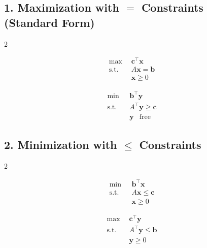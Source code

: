 \subsection*{1. Maximization with $=$ Constraints (Standard Form)}

\begin{multicols}{2}
\begin{tcolorbox}[title=Primal (P), colback=blue!5, colframe=blue!40!black]
\[
\begin{aligned}
\max\ & \mathbf{c}^\top \mathbf{x} \\
\text{s.t.} \quad & A \mathbf{x} = \mathbf{b} \\
& \mathbf{x} \geq 0
\end{aligned}
\]
\end{tcolorbox}

\columnbreak

\begin{tcolorbox}[title=Dual (D), colback=green!5, colframe=green!40!black]
\[
\begin{aligned}
\min\ & \mathbf{b}^\top \mathbf{y} \\
\text{s.t.} \quad & A^\top \mathbf{y} \geq \mathbf{c} \\
& \mathbf{y} \ \ \text{ free}
\end{aligned}
\]
\end{tcolorbox}
\end{multicols}

\subsection*{2. Minimization with $\leq$ Constraints}

\begin{multicols}{2}
\begin{tcolorbox}[title=Primal (P), colback=blue!5, colframe=blue!40!black]
\[
\begin{aligned}
\min\ & \mathbf{b}^\top \mathbf{x} \\
\text{s.t.} \quad & A \mathbf{x} \leq \mathbf{c} \\
& \mathbf{x} \geq 0
\end{aligned}
\]
\end{tcolorbox}

\columnbreak

\begin{tcolorbox}[title=Dual (D), colback=green!5, colframe=green!40!black]
\[
\begin{aligned}
\max\ & \mathbf{c}^\top \mathbf{y} \\
\text{s.t.} \quad & A^\top \mathbf{y} \leq \mathbf{b} \\
& \mathbf{y} \geq 0
\end{aligned}
\]
\end{tcolorbox}
\end{multicols}

